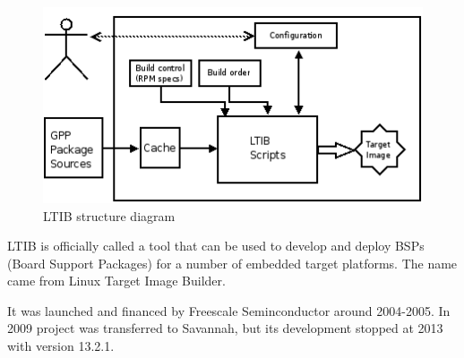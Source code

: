 \documentclass[printmode]{mgr}
\begin{document}
\begin{figure}[htbp]
  \centering
    \includegraphics[width=\textwidth]{ltib-diagram.png}
    \caption{LTIB structure diagram}
  \label{fig:ltib-diagram}
\end{figure}


LTIB is officially called a tool that can be used to develop and deploy BSPs (Board Support Packages) for a number of embedded target platforms. The name came from Linux Target Image Builder.

It was launched and financed by Freescale Seminconductor around 2004-2005. In 2009 project was transferred to Savannah, but its development stopped at 2013 with version 13.2.1.







\end{document}
